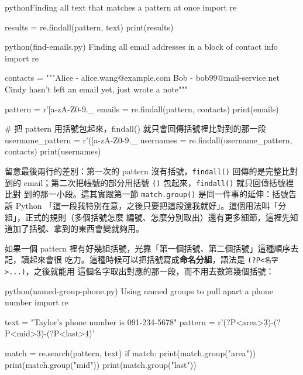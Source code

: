 \begin{code}{python}{Finding all text that matches a pattern at once}
import re

results = re.findall(pattern, text)
print(results)
\end{code}

\begin{example}{python}{(find-emails.py) Finding all email addresses in a block of contact info}
import re

contacts = """Alice - alice.wang@example.com
Bob - bob99@mail-service.net
Cindy hasn't left an email yet, just wrote a note"""

pattern = r'[a-zA-Z0-9._%
emails = re.findall(pattern, contacts)
print(emails)

# 把 pattern 用括號包起來，findall() 就只會回傳括號裡比對到的那一段
username_pattern = r'([a-zA-Z0-9._%
usernames = re.findall(username_pattern, contacts)
print(usernames)
\end{example}


留意最後兩行的差別：第一次的 pattern 沒有括號，\texttt{findall()} 回傳的是完整比對到的
email；第二次把帳號的部分用括號 \texttt{()} 包起來，\texttt{findall()} 就只回傳括號裡比對
到的那一小段。這其實跟第一節 \texttt{match.group()} 是同一件事的延伸：括號告訴 Python
「這一段我特別在意，之後只要把這段還我就好」。這個用法叫「分組」，正式的規則（多個括號怎麼
編號、怎麼分別取出）還有更多細節，這裡先知道加了括號、拿到的東西會變就夠用。

如果一個 pattern 裡有好幾組括號，光靠「第一個括號、第二個括號」這種順序去記，讀起來會很
吃力。這種時候可以把括號寫成\textbf{命名分組}，語法是 \texttt{(?P<名字>...)}，之後就能用
這個名字取出對應的那一段，而不用去數第幾個括號：

\begin{example}{python}{(named-group-phone.py) Using named groups to pull apart a phone number}
import re

text = "Taylor's phone number is 091-234-5678"
pattern = r'(?P<area>\d{3})-(?P<mid>\d{3})-(?P<last>\d{4})'

match = re.search(pattern, text)
if match:
    print(match.group("area"))
    print(match.group("mid"))
    print(match.group("last"))
\end{example}


